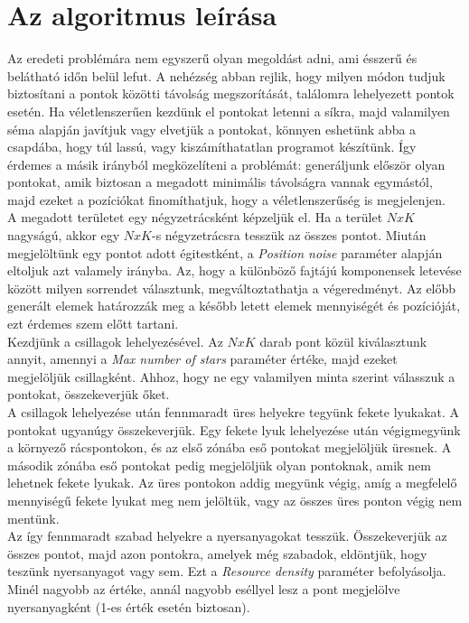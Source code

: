 \section{Az algoritmus leírása}
Az eredeti problémára nem egyszerű olyan megoldást adni, ami ésszerű és belátható időn belül lefut. A nehézség abban rejlik, hogy milyen módon tudjuk biztosítani a pontok közötti távolság megszorítását, találomra lehelyezett pontok esetén. Ha véletlenszerűen kezdünk el pontokat letenni a síkra, majd valamilyen séma alapján javítjuk vagy elvetjük a pontokat, könnyen eshetünk abba a csapdába, hogy túl lassú, vagy kiszámíthatatlan programot készítünk. Így érdemes a másik irányból megközelíteni a problémát: generáljunk először olyan pontokat, amik biztosan a megadott minimális távolságra vannak egymástól, majd ezeket a pozíciókat finomíthatjuk, hogy a véletlenszerűség is megjelenjen.\\
A megadott területet egy négyzetrácsként képzeljük el. Ha a terület $NxK$ nagyságú, akkor egy $NxK$-s négyzetrácsra tesszük az összes pontot. Miután megjelöltünk egy pontot adott égitestként, a \textit{Position noise} paraméter alapján eltoljuk azt valamely irányba. Az, hogy a különböző fajtájú komponensek letevése között milyen sorrendet választunk, megváltoztathatja a végeredményt. Az előbb generált elemek határozzák meg a később letett elemek mennyiségét és pozícióját, ezt érdemes szem előtt tartani.\\
Kezdjünk a csillagok lehelyezésével. Az $NxK$ darab pont közül kiválasztunk annyit, amennyi a \textit{Max number of stars} paraméter értéke, majd ezeket megjelöljük csillagként. Ahhoz, hogy ne egy valamilyen minta szerint válasszuk a pontokat, összekeverjük őket.\\
A csillagok lehelyezése után fennmaradt üres helyekre tegyünk fekete lyukakat. A pontokat ugyanúgy összekeverjük. Egy fekete lyuk lehelyezése után végigmegyünk a környező rácspontokon, és az első zónába eső pontokat megjelöljük üresnek. A második zónába eső pontokat pedig megjelöljük olyan pontoknak, amik nem lehetnek fekete lyukak. Az üres pontokon addig megyünk végig, amíg a megfelelő mennyiségű fekete lyukat meg nem jelöltük, vagy az összes üres ponton végig nem mentünk.\\
Az így fennmaradt szabad helyekre a nyersanyagokat tesszük. Összekeverjük az összes pontot, majd azon pontokra, amelyek még szabadok, eldöntjük, hogy teszünk nyersanyagot vagy sem. Ezt a \textit{Resource density} paraméter befolyásolja. Minél nagyobb az értéke, annál nagyobb eséllyel lesz a pont megjelölve nyersanyagként (1-es érték esetén biztosan).\\
